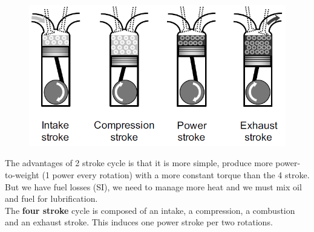 		\begin{figure}
		\vspace{-5mm}
		\includegraphics[scale=0.33]{ch1/8}
		\label{fig:1.8}
		\end{figure}
		The advantages of 2 stroke cycle is that it is more simple, produce more power-to-weight (1 power every rotation) with a more constant torque than the 4 stroke. But we have fuel losses (SI), we need to manage more heat and we must mix oil and fuel for lubrification. \\
		
		The \textbf{four stroke} cycle is composed of an intake, a compression, a combustion and an exhaust stroke. This induces one power stroke per two rotations.  